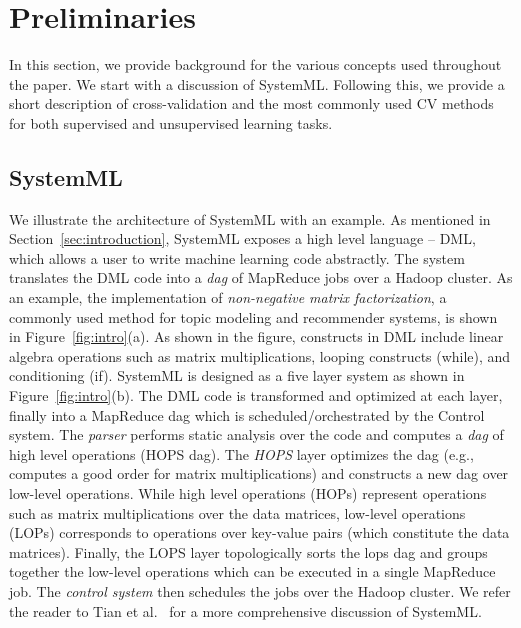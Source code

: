 \documentclass{vldb}
\begin{document}
\section{Preliminaries}
\label{sec:background}
In this section, we provide background for the various concepts used throughout
the paper. We start with a discussion of SystemML. Following this, we provide a short
description of cross-validation and the most commonly used CV methods for both
supervised and unsupervised learning tasks.

\subsection{SystemML}
We illustrate the architecture of SystemML with an example. As mentioned
in Section~\ref{sec:introduction}, SystemML exposes a high level language --
DML, which allows a user to write machine learning code abstractly.
The system translates the DML code into a {\em dag} of MapReduce jobs over
a Hadoop cluster.
As an example, the implementation of {\em non-negative matrix
factorization}, a commonly used method for topic modeling and recommender
systems, is shown in Figure~\ref{fig:intro}(a). As shown in the figure, constructs in
DML include linear algebra operations such as matrix multiplications, looping
constructs (while), and conditioning
(if). SystemML is designed as a five layer system as shown in
Figure~\ref{fig:intro}(b). The DML code is transformed and optimized at each layer,
finally into a MapReduce dag which is scheduled/orchestrated by the Control system.
The {\em parser} performs static analysis over the code and
computes a {\em dag} of high level operations (HOPS dag). The {\em HOPS} layer
optimizes the dag (e.g., computes a good order for matrix multiplications) and
constructs a new dag over low-level operations. While high level operations
(HOPs) represent operations such as matrix multiplications over the data
matrices, low-level operations (LOPs) corresponds to operations over key-value
pairs (which constitute the data matrices). Finally, the LOPS layer
topologically sorts the lops dag and groups together the low-level operations
which can be executed in a single MapReduce job. The {\em control system} then
schedules the jobs over the Hadoop cluster. We refer the reader to Tian et
al.~\cite{DBLP:conf/icde/TianK11} for a more comprehensive discussion of
SystemML.
\end{document}
